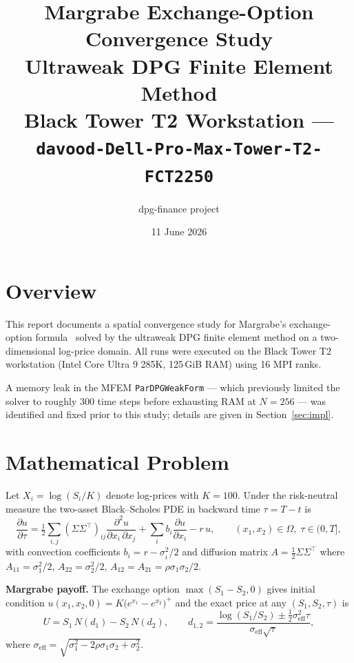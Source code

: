 \documentclass[11pt,a4paper]{article}
\title{\textbf{Margrabe Exchange-Option Convergence Study}\\[0.4em]
\large Ultraweak DPG Finite Element Method\\[0.2em]
\normalsize Black Tower T2 Workstation --- \texttt{davood-Dell-Pro-Max-Tower-T2-FCT2250}}
\author{dpg-finance project}
\date{11 June 2026}
\begin{document}
\maketitle

\section{Overview}

This report documents a spatial convergence study for Margrabe's exchange-option
formula~\cite{margrabe1978value} solved by the ultraweak DPG finite element method on a
two-dimensional log-price domain.  All runs were executed on the Black Tower T2
workstation (Intel Core Ultra 9 285K, 125\,GiB RAM) using 16 MPI ranks.

A memory leak in the MFEM \texttt{ParDPGWeakForm} --- which previously limited the solver
to roughly 300 time steps before exhausting RAM at $N=256$ --- was identified and fixed
prior to this study; details are given in Section~\ref{sec:impl}.

\section{Mathematical Problem}

Let $X_i = \log(S_i/K)$ denote log-prices with $K=100$.
Under the risk-neutral measure the two-asset Black--Scholes PDE in backward time
$\tau = T - t$ is
\begin{equation}
  \frac{\partial u}{\partial\tau}
  = \tfrac{1}{2}\sum_{i,j} (\Sigma\Sigma^\top)_{ij}
      \frac{\partial^2 u}{\partial x_i\,\partial x_j}
  + \sum_i b_i \frac{\partial u}{\partial x_i}
  - r\,u,
  \qquad (x_1,x_2)\in\Omega,\;\tau\in(0,T],
\end{equation}
with convection coefficients $b_i = r - \sigma_i^2/2$ and diffusion matrix
$A = \tfrac{1}{2}\Sigma\Sigma^\top$ where
$A_{11}=\sigma_1^2/2$, $A_{22}=\sigma_2^2/2$,
$A_{12}=A_{21}=\rho\sigma_1\sigma_2/2$.

\textbf{Margrabe payoff.} The exchange option $\max(S_1-S_2,0)$ gives initial condition
$u(x_1,x_2,0) = K\bigl(e^{x_1}-e^{x_2}\bigr)^+$
and the exact price at any $(S_1,S_2,\tau)$ is
\begin{equation}
  U = S_1\,N(d_1) - S_2\,N(d_2),
  \qquad
  d_{1,2} = \frac{\log(S_1/S_2)\pm\tfrac{1}{2}\sigma_\mathrm{eff}^2\tau}%
                  {\sigma_\mathrm{eff}\sqrt{\tau}},
\end{equation}
where $\sigma_\mathrm{eff}=\sqrt{\sigma_1^2-2\rho\sigma_1\sigma_2+\sigma_2^2}$.
\end{document}
